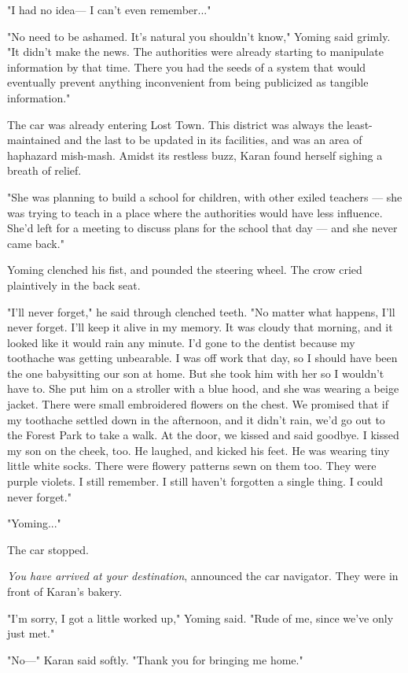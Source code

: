 "I had no idea--- I can't even remember..."

"No need to be ashamed. It's natural you shouldn't know," Yoming said
grimly. "It didn't make the news. The authorities were already starting
to manipulate information by that time. There you had the seeds of a
system that would eventually prevent anything inconvenient from being
publicized as tangible information."

The car was already entering Lost Town. This district was always the
least-maintained and the last to be updated in its facilities, and was
an area of haphazard mish-mash. Amidst its restless buzz, Karan found
herself sighing a breath of relief.

"She was planning to build a school for children, with other exiled
teachers --- she was trying to teach in a place where the authorities
would have less influence. She'd left for a meeting to discuss plans for
the school that day --- and she never came back."

Yoming clenched his fist, and pounded the steering wheel. The crow cried
plaintively in the back seat.

"I'll never forget," he said through clenched teeth. "No matter what
happens, I'll never forget. I'll keep it alive in my memory. It was
cloudy that morning, and it looked like it would rain any minute. I'd
gone to the dentist because my toothache was getting unbearable. I was
off work that day, so I should have been the one babysitting our son at
home. But she took him with her so I wouldn't have to. She put him on a
stroller with a blue hood, and she was wearing a beige jacket. There
were small embroidered flowers on the chest. We promised that if my
toothache settled down in the afternoon, and it didn't rain, we'd go out
to the Forest Park to take a walk. At the door, we kissed and said
goodbye. I kissed my son on the cheek, too. He laughed, and kicked his
feet. He was wearing tiny little white socks. There were flowery
patterns sewn on them too. They were purple violets. I still remember. I
still haven't forgotten a single thing. I could never forget."

"Yoming..."

The car stopped.

\emph{You have arrived at your destination}, announced the car navigator. They
were in front of Karan's bakery.

"I'm sorry, I got a little worked up," Yoming said. "Rude of me, since
we've only just met."

"No---" Karan said softly. "Thank you for bringing me home."

